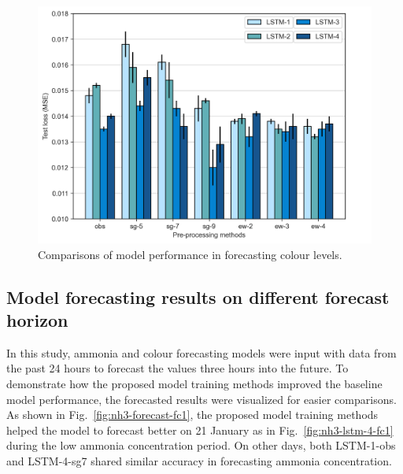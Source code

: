 \begin{figure}[!ht]
    \centering
    \includegraphics[width=1.0\columnwidth]{imgs/results/feature-engineering/colour-input-1-4-comparison.png}
    \caption{Comparisons of model performance in forecasting colour levels.}
    \label{fig:colour-feature-engineering}
 \end{figure}


\subsection{Model forecasting results on different forecast horizon}
In this study, ammonia and colour forecasting models were input with data from the past 24 hours to forecast the values three hours into the future. To demonstrate how the proposed model training methods improved the baseline model performance, the forecasted results were visualized for easier comparisons. As shown in Fig.~\ref{fig:nh3-forecast-fc1}, the proposed model training methods helped the model to forecast better on 21 January as in Fig.~\ref{fig:nh3-lstm-4-fc1} during the low ammonia concentration period. On other days, both LSTM-1-obs and LSTM-4-sg7 shared similar accuracy in forecasting ammonia concentration.

